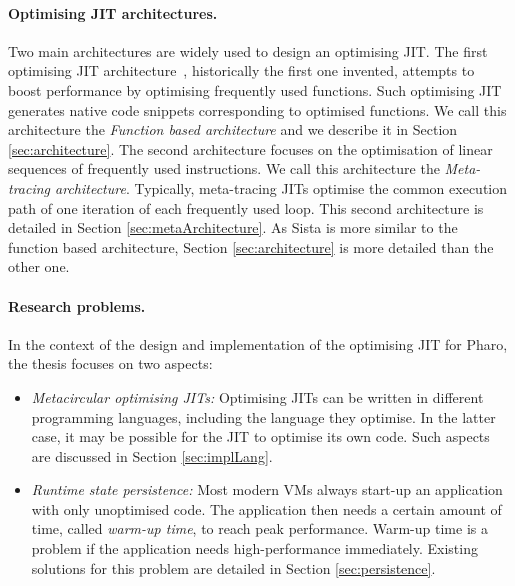 \documentclass[a4paper,12pt,twoside]{../includes/ThesisStyle}
\begin{document}
\paragraph{Optimising JIT architectures.} Two main architectures are widely used to design an optimising JIT. The first optimising JIT architecture~\cite{UrsPHD}, historically the first one invented, attempts to boost performance by optimising frequently used functions. Such optimising JIT generates native code snippets corresponding to optimised functions. We call this architecture the \emph{Function based architecture} and we describe it in Section \ref{sec:architecture}. The second architecture focuses on the optimisation of linear sequences of frequently used instructions. We call this architecture the \emph{Meta-tracing architecture}. Typically, meta-tracing JITs optimise the common execution path of one iteration of each frequently used loop. This second architecture is detailed in Section \ref{sec:metaArchitecture}. As Sista is more similar to the function based architecture, Section \ref{sec:architecture} is more detailed than the other one.

\paragraph{Research problems.} In the context of the design and implementation of the optimising JIT for Pharo, the thesis focuses on 
two
aspects:
\begin{itemize}
	\item \emph{Metacircular optimising JITs: } Optimising JITs can be written in different programming languages, including the language they optimise. In the latter case, it may be possible for the JIT to optimise its own code. Such aspects are discussed in Section \ref{sec:implLang}.
	\item \emph{Runtime state persistence:} Most modern VMs always start-up an application with only unoptimised code. The application then needs a certain amount of time, called \emph{warm-up time}, to reach peak performance. Warm-up time is a problem if the application needs high-performance immediately. Existing solutions for this problem are detailed in Section \ref{sec:persistence}.
\end{itemize}
\end{document}
